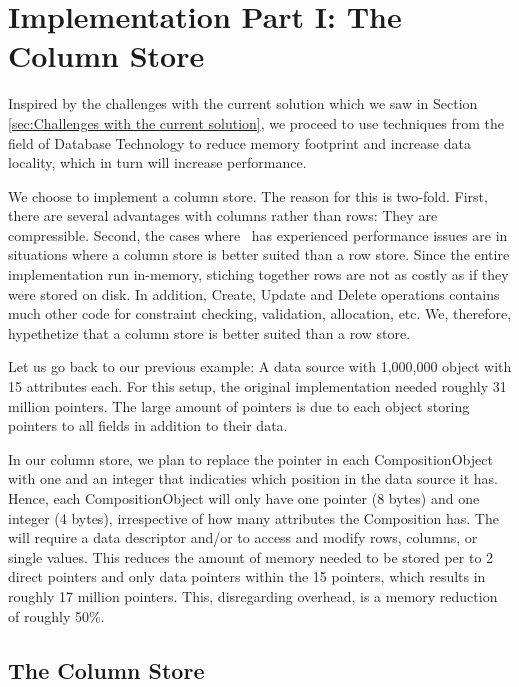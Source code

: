 \chapter{Implementation Part I: The Column Store}
\label{chap:Implementation Part I: The Column Store}
Inspired by the challenges with the current solution which we saw in Section \ref{sec:Challenges with the current solution}, we proceed to use techniques from the field of Database Technology to reduce memory footprint and increase data locality, which in turn will increase performance. 

We choose to implement a column store. The reason for this is two-fold. First, there are several advantages with columns rather than rows: They are compressible. Second, the cases where \genus~has experienced performance issues are in situations where a column store is better suited than a row store. Since the entire implementation run in-memory, stiching together rows are not as costly as if they were stored on disk. In addition, Create, Update and Delete operations contains much other code for constraint checking, validation, allocation, etc. We, therefore, hypethetize that a column store is better suited than a row store.

Let us go back to our previous example: A data source with 1,000,000 object with 15 attributes each. For this setup, the original implementation needed roughly 31 million pointers. The large amount of pointers is due to each object storing pointers to all fields in addition to their data.

In our column store, we plan to replace the  pointer in each CompositionObject with one  and an integer  that indicaties which position in the data source it has. Hence, each CompositionObject will only have one pointer (8 bytes) and one integer (4 bytes), irrespective of how many attributes the Composition has. The  will require a data descriptor and/or  to access and modify rows, columns, or single values. This reduces the amount of memory needed to be stored per  to 2 direct pointers and only data pointers within the  15 pointers, which results in roughly 17 million pointers. This, disregarding overhead, is a memory reduction of roughly 50\%.


\section{The Column Store}
\label{sec:The CompositionComObjValueCollection}

